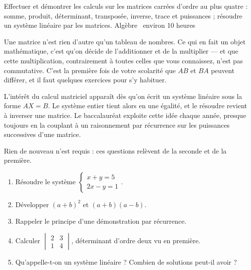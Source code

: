   {Effectuer et démontrer les calculs sur les matrices carrées d'ordre au plus
   quatre : somme, produit, déterminant, transposée, inverse, trace et
   puissances ; résoudre un système linéaire par les matrices.}
  {Algèbre \textbullet\ environ 10 heures}

Une matrice n'est rien d'autre qu'un tableau de nombres. Ce qui en fait un
objet mathématique, c'est qu'on décide de l'additionner et de la multiplier —
et que cette multiplication, contrairement à toutes celles que vous connaissez,
n'est pas commutative. C'est la première fois de votre scolarité que $AB$ et
$BA$ peuvent différer, et il faut quelques exercices pour s'y habituer.

L'intérêt du calcul matriciel apparaît dès qu'on écrit un système linéaire
sous la forme $AX = B$. Le système entier tient alors en une égalité, et le
résoudre revient à inverser une matrice. Le baccalauréat exploite cette idée
chaque année, presque toujours en la couplant à un raisonnement par récurrence
sur les puissances successives d'une matrice.

\begin{revision}
Rien de nouveau n'est requis : ces questions relèvent de la seconde et de la
première.

\begin{enumerate}[label=\textbf{\arabic*.}, leftmargin=*, itemsep=0.35em]
  \item Résoudre le système $\begin{cases} x+y = 5 \\ 2x-y = 1 \end{cases}$.
  \item Développer $(a+b)^{2}$ et $(a+b)(a-b)$.
  \item Rappeler le principe d'une démonstration par récurrence.
  \item Calculer $\begin{vmatrix} 2 & 3 \\ 1 & 4 \end{vmatrix}$, déterminant
        d'ordre deux vu en première.
  \item Qu'appelle-t-on un système linéaire ? Combien de solutions peut-il
        avoir ?
\end{enumerate}
\end{revision}


